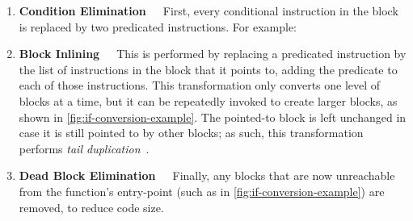 \begin{enumerate}
\item\textbf{Condition Elimination}~~~First, every conditional instruction in
  the block is replaced by two predicated  instructions. For example:
\begin{center}
\end{center}


\item\textbf{Block Inlining}~~~This is performed by replacing a predicated
   instruction by the list of instructions in the block that it
  points to, adding the predicate to each of those instructions. This
  transformation only converts one level of blocks at a time, but it can be
  repeatedly invoked to create larger blocks, as shown in
  \cref{fig:if-conversion-example}. The pointed-to block is left unchanged in
  case it is still pointed to by other blocks; as such, this transformation
  performs \emph{tail
    duplication}~\cite{chang91_using_profil_infor_assis_class_code_optim}.

\item\textbf{Dead Block Elimination}~~~Finally, any blocks that are now
  unreachable from the function's entry-point (such as
   in \cref{fig:if-conversion-example}) are
    removed, to reduce code size.
\end{enumerate}


